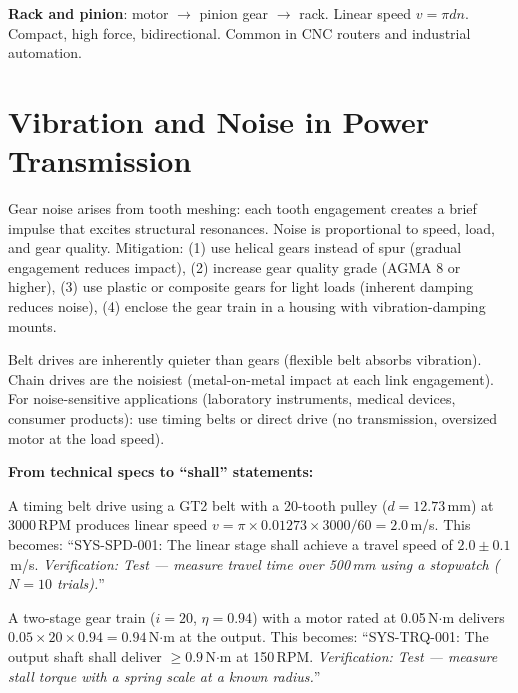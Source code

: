 \documentclass[11pt,letterpaper,twoside,openany]{book}
\begin{document}
\textbf{Rack and pinion}: motor $\to$ pinion gear $\to$ rack. Linear speed $v = \pi d n$. Compact, high force, bidirectional. Common in CNC routers and industrial automation.

\section{Vibration and Noise in Power Transmission}
Gear noise arises from tooth meshing: each tooth engagement creates a brief impulse that excites structural resonances. Noise is proportional to speed, load, and gear quality. Mitigation: (1) use helical gears instead of spur (gradual engagement reduces impact), (2) increase gear quality grade (AGMA 8 or higher), (3) use plastic or composite gears for light loads (inherent damping reduces noise), (4) enclose the gear train in a housing with vibration-damping mounts.

Belt drives are inherently quieter than gears (flexible belt absorbs vibration). Chain drives are the noisiest (metal-on-metal impact at each link engagement). For noise-sensitive applications (laboratory instruments, medical devices, consumer products): use timing belts or direct drive (no transmission, oversized motor at the load speed).
\begin{keyconceptbox}
\textbf{From technical specs to ``shall'' statements:}

A timing belt drive using a GT2 belt with a 20-tooth pulley ($d = 12.73$\,mm) at 3000\,RPM produces linear speed $v = \pi \times 0.01273 \times 3000/60 = 2.0$\,m/s. This becomes: ``SYS-SPD-001: The linear stage shall achieve a travel speed of $2.0 \pm 0.1$\,m/s. \emph{Verification: Test --- measure travel time over 500\,mm using a stopwatch ($N = 10$ trials).}''

A two-stage gear train ($i = 20$, $\eta = 0.94$) with a motor rated at 0.05\,N$\cdot$m delivers $0.05 \times 20 \times 0.94 = 0.94$\,N$\cdot$m at the output. This becomes: ``SYS-TRQ-001: The output shaft shall deliver $\geq 0.9$\,N$\cdot$m at 150\,RPM. \emph{Verification: Test --- measure stall torque with a spring scale at a known radius.}''
\end{keyconceptbox}
\end{document}
